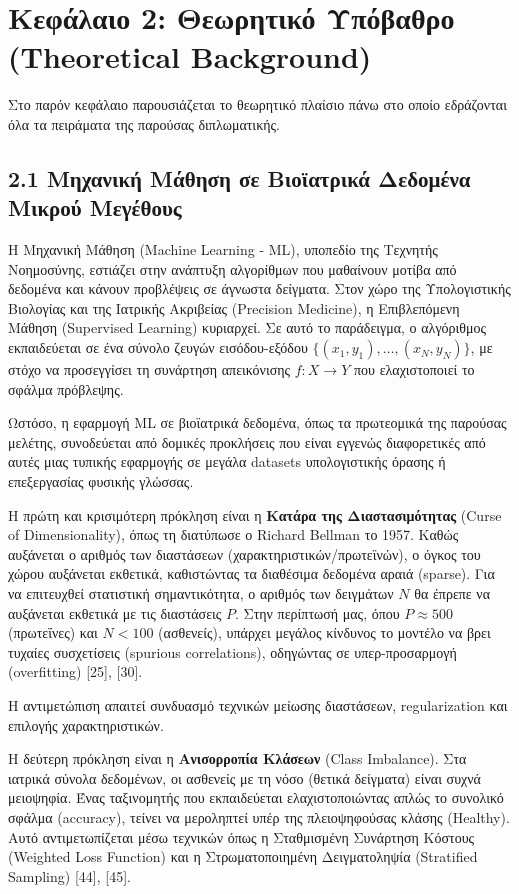 \sloppy
\section{Κεφάλαιο 2: Θεωρητικό Υπόβαθρο (Theoretical Background)}

Στο παρόν κεφάλαιο παρουσιάζεται το θεωρητικό πλαίσιο πάνω στο οποίο εδράζονται όλα τα πειράματα της παρούσας διπλωματικής.

\subsection{2.1 Μηχανική Μάθηση σε Βιοϊατρικά Δεδομένα Μικρού Μεγέθους}

Η Μηχανική Μάθηση (Machine Learning - ML), υποπεδίο της Τεχνητής Νοημοσύνης, εστιάζει στην ανάπτυξη αλγορίθμων που μαθαίνουν μοτίβα από δεδομένα και κάνουν προβλέψεις σε άγνωστα δείγματα. Στον χώρο της Υπολογιστικής Βιολογίας και της Ιατρικής Ακριβείας (Precision Medicine), η Επιβλεπόμενη Μάθηση (Supervised Learning) κυριαρχεί. Σε αυτό το παράδειγμα, ο αλγόριθμος εκπαιδεύεται σε ένα σύνολο ζευγών εισόδου-εξόδου $\{(x_1, y_1), \ldots, (x_N, y_N)\}$, με στόχο να προσεγγίσει τη συνάρτηση απεικόνισης $f: X \to Y$ που ελαχιστοποιεί το σφάλμα πρόβλεψης. 

Ωστόσο, η εφαρμογή ML σε βιοϊατρικά δεδομένα, όπως τα πρωτεομικά της παρούσας μελέτης, συνοδεύεται από δομικές προκλήσεις που είναι εγγενώς διαφορετικές από αυτές μιας τυπικής εφαρμογής σε μεγάλα datasets υπολογιστικής όρασης ή επεξεργασίας φυσικής γλώσσας.

Η πρώτη και κρισιμότερη πρόκληση είναι η \textbf{Κατάρα της Διαστασιμότητας} (Curse of Dimensionality), όπως τη διατύπωσε ο Richard Bellman το 1957. Καθώς αυξάνεται ο αριθμός των διαστάσεων (χαρακτηριστικών/πρωτεϊνών), ο όγκος του χώρου αυξάνεται εκθετικά, καθιστώντας τα διαθέσιμα δεδομένα αραιά (sparse). Για να επιτευχθεί στατιστική σημαντικότητα, ο αριθμός των δειγμάτων $N$ θα έπρεπε να αυξάνεται εκθετικά με τις διαστάσεις $P$. Στην περίπτωσή μας, όπου $P \approx 500$ (πρωτεΐνες) και $N < 100$ (ασθενείς), υπάρχει μεγάλος κίνδυνος το μοντέλο να βρει τυχαίες συσχετίσεις (spurious correlations), οδηγώντας σε υπερ-προσαρμογή (overfitting) [25], [30]. 

Η αντιμετώπιση απαιτεί συνδυασμό τεχνικών μείωσης διαστάσεων, regularization και επιλογής χαρακτηριστικών.

Η δεύτερη πρόκληση είναι η \textbf{Ανισορροπία Κλάσεων} (Class Imbalance). Στα ιατρικά σύνολα δεδομένων, οι ασθενείς με τη νόσο (θετικά δείγματα) είναι συχνά μειοψηφία. Ένας ταξινομητής που εκπαιδεύεται ελαχιστοποιώντας απλώς το συνολικό σφάλμα (accuracy), τείνει να μεροληπτεί υπέρ της πλειοψηφούσας κλάσης (Healthy). Αυτό αντιμετωπίζεται μέσω τεχνικών όπως η Σταθμισμένη Συνάρτηση Κόστους (Weighted Loss Function) και η Στρωματοποιημένη Δειγματοληψία (Stratified Sampling) [44], [45].

